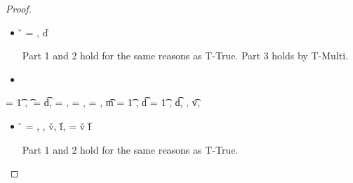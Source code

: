 \begin{lemma}
\begin{enumerate}
\begin{proof}
\begin{case}[T-DefMulti]
\begin{itemize}
  \item[]
\begin{subcase}[B-DefMulti]
  \v{} = { {\emptydisptable}},
  \opsem {\openv{}} {} {\v{d}}


Part 1 and 2 hold for the same reasons as T-True.
Part 3 holds by T-Multi.
\end{subcase}
  \item[]
\begin{subcase}[BE-DefMulti]
\end{subcase}
\end{itemize}
\end{case}

\begin{case}[T-DefMethod]
  \e{} = { {} 
                          {\abs {\x{}} {\t{1}} {}}},
  \t{} = { {\t{d}}},
  \thenprop{\prop{}} = {\topprop{}},
  \elseprop{\prop{}} = {\botprop{}},
  \object{} = {\emptyobject{}},
  \t{m} = {\ArrowOne {\x{}} {\t{1}} {\s{}}
                     {
                                 {}}
                     {}},
  \t{d} = {\ArrowOne {\x{}} {\t{1}} {\sp{}}
                     {
                                 {}}
                     {}},
  \judgementtwo {\propenv{}} { { {\t{d}}}},
  ,
  \judgementtwo {\propenv{}}
               { {\t{v}}},
           { {\s{}}}
           {
                       {}}
           {}

  \begin{itemize}
    \item[]
      \begin{subcase}[B-DefMethod]
       \v{} = { {\disptablep{}}},
        \opsem {\openv{}}
               {}
               { {\disptable{}}},
  \opsem {\openv{}}
         {}
         {\v{v}},
  \opsem {\openv{}}
         {}
         {\v{f}},
         \disptablep{} = {\extenddisptable {\disptable{}} 
                                {\v{v}}
                                {\v{f}}}

Part 1 and 2 hold for the same reasons as T-True.


\end{subcase}
\end{itemize}
\end{case}
\end{proof}
\end{enumerate}
\end{lemma}
